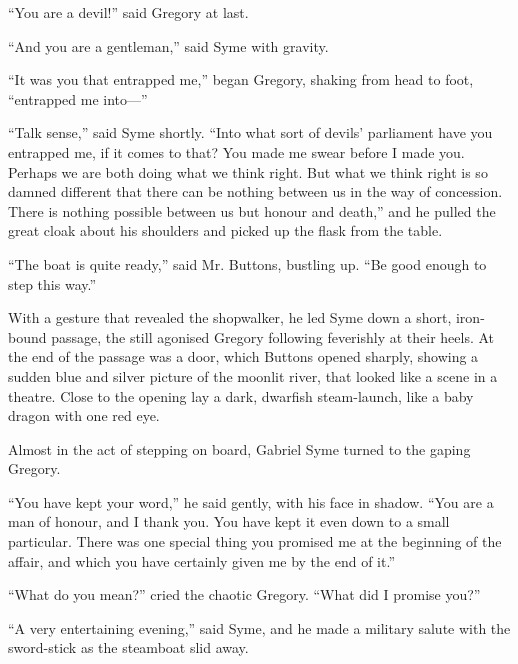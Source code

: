 \documentclass{book}
\begin{document}
“You are a devil!” said Gregory at last.

“And you are a gentleman,” said Syme with gravity.

“It was you that entrapped me,” began Gregory, shaking from head to foot, “entrapped me into—”

“Talk sense,” said Syme shortly. “Into what sort of devils’ parliament have you entrapped me, if it comes to that? You made me swear before I made you. Perhaps we are both doing what we think right. But what we think right is so damned different that there can be nothing between us in the way of concession. There is nothing possible between us but honour and death,” and he pulled the great cloak about his shoulders and picked up the flask from the table.

“The boat is quite ready,” said Mr. Buttons, bustling up. “Be good enough to step this way.”

With a gesture that revealed the shopwalker, he led Syme down a short, iron-bound passage, the still agonised Gregory following feverishly at their heels. At the end of the passage was a door, which Buttons opened sharply, showing a sudden blue and silver picture of the moonlit river, that looked like a scene in a theatre. Close to the opening lay a dark, dwarfish steam-launch, like a baby dragon with one red eye.

Almost in the act of stepping on board, Gabriel Syme turned to the gaping Gregory.

“You have kept your word,” he said gently, with his face in shadow. “You are a man of honour, and I thank you. You have kept it even down to a small particular. There was one special thing you promised me at the beginning of the affair, and which you have certainly given me by the end of it.”

“What do you mean?” cried the chaotic Gregory. “What did I promise you?”

“A very entertaining evening,” said Syme, and he made a military salute with the sword-stick as the steamboat slid away.
\end{document}

